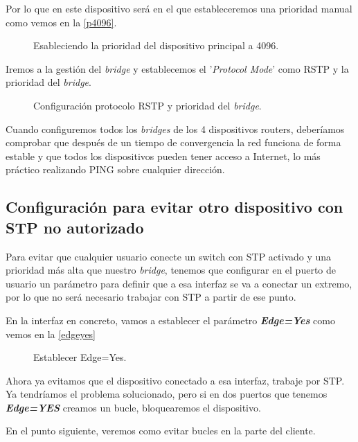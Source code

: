 Por lo que en este dispositivo será en el que estableceremos una prioridad manual como vemos en la \autoref{p4096}.

\begin{figure}[h!]\centering
	\caption{Esableciendo la prioridad del dispositivo principal a 4096.}
	\label{p4096}
	\bigskip
\end{figure}


Iremos a la gestión del \textit{bridge} y establecemos el '\textit{Protocol Mode}' como RSTP y la prioridad del \textit{bridge}.
\begin{figure}[h!]\centering
	\caption{Configuración protocolo RSTP y prioridad del \textit{bridge}.}
	\label{f45}
	\bigskip
\end{figure}

Cuando configuremos todos los \textit{bridges} de los 4 dispositivos routers, deberíamos comprobar que después de un tiempo de convergencia la red funciona de forma estable y que todos los dispositivos pueden tener acceso a Internet, lo más práctico realizando PING sobre cualquier dirección.


\subsection{Configuración para evitar otro dispositivo con STP no autorizado}

Para evitar que cualquier usuario conecte un switch con STP activado y una prioridad más alta que nuestro \textit{bridge}, tenemos que configurar en el puerto de usuario un parámetro para definir que a esa interfaz se va a conectar un extremo, por lo que no será necesario trabajar con STP a partir de ese punto.

En la interfaz en concreto, vamos a establecer el parámetro \textit{\textbf{Edge=Yes}} como vemos en la  \autoref{edgeyes}

\begin{figure}[h!]\centering
	\caption{Establecer Edge=Yes.}
	\label{edgeyes}
	\bigskip
\end{figure}

Ahora ya evitamos que el dispositivo conectado a esa interfaz, trabaje por STP. Ya tendríamos el problema solucionado, pero si en dos puertos que tenemos \textbf{\textit{Edge=YES}} creamos un bucle, bloquearemos el dispositivo.

En el punto siguiente, veremos como evitar bucles en la parte del cliente.

